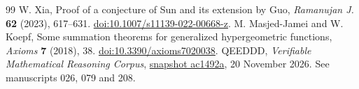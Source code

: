 \documentclass[11pt,a4paper]{article}
\theoremstyle{definition}\newtheorem{problem}[theorem]{Auxiliary problem}
\theoremstyle{remark}\newtheorem*{remark}{Remark}
\begin{document}
\begin{thebibliography}{99}
 W. Xia, Proof of a conjecture of Sun and its extension by Guo, \emph{Ramanujan J.} \textbf{62} (2023), 617--631. \href{https://doi.org/10.1007/s11139-022-00668-z}{doi:10.1007/s11139-022-00668-z}.
 M. Masjed-Jamei and W. Koepf, Some summation theorems for generalized hypergeometric functions, \emph{Axioms} \textbf{7} (2018), 38. \href{https://doi.org/10.3390/axioms7020038}{doi:10.3390/axioms7020038}.
 QEEDDD, \emph{Verifiable Mathematical Reasoning Corpus}, \href{https://github.com/QEEDDD/Verifiable-Mathematical-Reasoning-Corpus/tree/ac1492a50784be919fe0b5e8f19f96f8d221a22e}{snapshot ac1492a}, 20 November 2026. See manuscripts 026, 079 and 208.
\end{thebibliography}\endgroup
\end{document}
